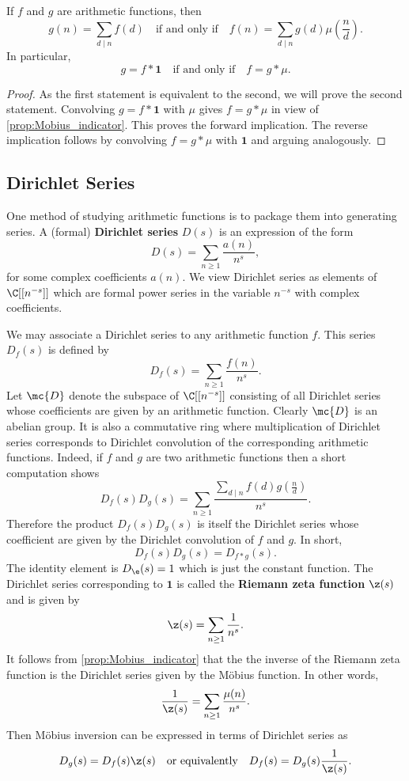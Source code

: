 \documentclass[12pt]{article}
\begin{document}
      \begin{theorem*}
        If \(f\) and \(g\) are arithmetic functions, then
        \[
          g(n) = \sum_{d \mid n}f(d) \quad \text{if and only if} \quad f(n) = \sum_{d \mid n}g(d)\mu\left(\frac{n}{d}\right).
        \]
        In particular,
        \[
          g = f \ast \mathbf{1} \quad \text{if and only if} \quad f = g \ast \mu.
        \]
      \end{theorem*}
      \begin{proof}
        As the first statement is equivalent to the second, we will prove the second statement. Convolving \(g = f \ast \mathbf{1}\) with \(\mu\) gives \(f = g \ast \mu\) in view of \cref{prop:Mobius_indicator}. This proves the forward implication. The reverse implication follows by convolving \(f = g \ast \mu\) with \(\mathbf{1}\) and arguing analogously.
      \end{proof}
    \subsection{Dirichlet Series}
      One method of studying arithmetic functions is to package them into generating series. A (formal) \textbf{Dirichlet series} \(D(s)\) is an expression of the form
      \[
        D(s) = \sum_{n \ge 1}\frac{a(n)}{n^{s}},
      \]
      for some complex coefficients \(a(n)\). We view Dirichlet series as elements of \(\C[[n^{-s}]]\) which are formal power series in the variable \(n^{-s}\) with complex coefficients.
      
      We may associate a Dirichlet series to any arithmetic function \(f\). This series \(D_{f}(s)\) is defined by
      \[
        D_{f}(s) = \sum_{n \ge 1}\frac{f(n)}{n^{s}}.
      \]
      Let \(\mc{D}\) denote the subspace of \(\C[[n^{-s}]]\) consisting of all Dirichlet series whose coefficients are given by an arithmetic function. Clearly \(\mc{D}\) is an abelian group. It is also a commutative ring where multiplication of Dirichlet series corresponds to Dirichlet convolution of the corresponding arithmetic functions. Indeed, if \(f\) and \(g\) are two arithmetic functions then a short computation shows
      \[
        D_{f}(s)D_{g}(s) = \sum_{n \ge 1}\frac{\sum_{d \mid n}f(d)g\left(\frac{n}{d}\right)}{n^{s}}.
      \]
      Therefore the product \(D_{f}(s)D_{g}(s)\) is itself the Dirichlet series whose coefficient are given by the Dirichlet convolution of \(f\) and \(g\). In short,
      \[
        D_{f}(s)D_{g}(s) = D_{f \ast g}(s).
      \]
      The identity element is \(D_{\e}(s) = 1\) which is just the constant function. The Dirichlet series corresponding to \(\mathbf{1}\) is called the \textbf{Riemann zeta function} \(\z(s)\) and is given by
      \[
        \z(s) = \sum_{n \ge 1}\frac{1}{n^{s}}.
      \]
      It follows from \cref{prop:Mobius_indicator} that the the inverse of the Riemann zeta function is the Dirichlet series given by the M\"obius function. In other words,
      \[
        \frac{1}{\z(s)} = \sum_{n \ge 1}\frac{\mu(n)}{n^{s}}.
      \]
      Then M\"obius inversion can be expressed in terms of Dirichlet series as
      \[
        D_{g}(s) = D_{f}(s)\z(s) \quad \text{or equivalently} \quad D_{f}(s) = D_{g}(s)\frac{1}{\z(s)}.
      \]  
\end{document}
